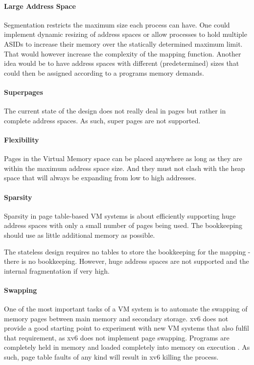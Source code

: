 \paragraph{Large Address Space} Segmentation restricts the maximum size each process can have. One could implement dynamic resizing of address spaces or allow processes to hold multiple ASIDs to increase their memory over the statically determined maximum limit.
That would however increase the complexity of the mapping function. Another idea would be to have address spaces with different (predetermined) sizes that could then be assigned according to a programs memory demands.

\paragraph{Superpages} The current state of the design does not really deal in pages but rather in complete address spaces. As such, super pages are not supported.

\paragraph{Flexibility} Pages in the Virtual Memory space can be placed anywhere as long as they are within the maximum address space size. And they must not clash with the heap space that will always be expanding from low to high addresses.

\paragraph{Sparsity} Sparsity in page table-based VM systems is about efficiently
supporting huge address spaces with only a small number of pages being used. The bookkeeping should use as little additional memory as possible.

The stateless design requires no tables to store the bookkeeping for the mapping - there is no bookkeeping. However, huge address spaces are not supported and the internal fragmentation if very high.

\paragraph{Swapping} One of the most important tasks of a VM system is to automate the swapping of memory pages between main memory and secondary storage. xv6 does not provide a good starting point to experiment with new VM systems that also fulfil that requirement, as xv6 does not implement page swapping. Programs are completely held in memory and loaded completely into memory on execution \cite{cox2011xv6}. As such, page table faults of any kind will result in xv6 killing the process.

